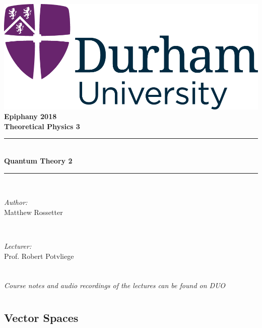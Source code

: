 \documentclass[a4paper,11pt,normalem]{article}
\newcommand{\HRule}{\rule{\linewidth}{0.5mm}}
\begin{document}
{\centering
{\includegraphics[scale=0.5]{../../logo0.png}\hfill{\Large\bfseries Epiphany 2018}}\\[1.5cm]
{\LARGE\bfseries Theoretical Physics 3}\\[0.5cm]
\HRule \\[0.3cm]
{\huge\bfseries Quantum Theory 2}\\[0.1cm]
\HRule \\[1cm]}
\begin{center}
\begin{minipage}{0.4\textwidth}
    \begin{flushleft} \large
        \emph{Author:} \\ Matthew Rossetter
    \end{flushleft}
\end{minipage}~
\begin{minipage}{0.4\textwidth}
    \begin{flushright} \large
        \emph{Lecturer:} \\ Prof. Robert Potvliege
    \end{flushright}
\end{minipage}
\end{center}

\section{}\label{lecture-1}

\emph{Course notes and audio recordings of the lectures can be found on
DUO}

\section{}\label{lecture-2}

\subsection{Vector Spaces}\label{vector-spaces}
\end{document}
